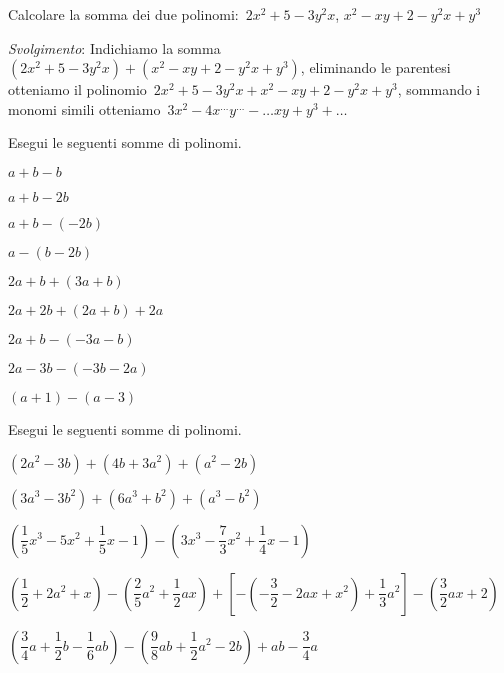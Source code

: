 \begin{esercizio}
\label{ese:10.12}
Calcolare la somma dei due polinomi:~\(2x^2+5-3y^2x\), \(x^2-xy+2-y^2x+y^3\)

\emph{Svolgimento}: Indichiamo la somma~\((2x^2+5-3y^2x)+(x^2-xy+2-y^2x+y^3)\), 
eliminando le parentesi otteniamo
il polinomio~\(2x^2+5-3y^2x+x^2-xy+2-y^2x+y^3\), sommando i monomi simili 
otteniamo~\(3x^2-4x^{\ldots}y^{\ldots}-\ldots xy+y^3+\ldots\)
\end{esercizio}
\begin{esercizio}
\label{ese:10.13}
 Esegui le seguenti somme di polinomi.
\begin{multicols}{3}
 \begin{enumeratea}
 \item \(a+b-b\)
 \item \(a+b-2b\)
 \item \(a+b-(-2b)\)
 \item \(a-(b-2b)\)
 \item \(2a+b+(3a+b)\)
 \item \(2a+2b+(2a+b)+2a\)
 \item \(2a+b-(-3a-b)\)
 \item \(2a-3b-(-3b-2a)\)
 \item \((a+1)-(a-3)\)
\end{enumeratea}
\end{multicols}
\end{esercizio}

\begin{esercizio}[\Ast]
\label{ese:10.14}
 Esegui le seguenti somme di polinomi.

 \begin{enumeratea}
 \item \(\left(2a^{2}-3b\right)+\left(4b+3a^{2}\right)+\left(a^{2}-2b\right)\)
 \item 
\(\left(3a^{3}-3b^{2}\right)+\left(6a^{3}+b^{2}\right)+\left(a^{3}-b^{2}\right)\)
 \item 
\(\left(\dfrac{1}{5}x^{3}-5x^{2}+\dfrac{1}{5}x-1\right)-\left(3x^{3}-\dfrac{7}{3}
x^{2}+\dfrac{1}{4}x-1\right)\)
 \item 
\(\left(\dfrac{1}{2}+2a^{2}+x\right)-\left(\dfrac{2}{5}a^{2}+\dfrac{1}{2}{ax}
\right)+\left[-\left(-{\dfrac{3}{2}}-2{ax}+x^{2}\right)+\dfrac{1}{3}a^{2}\right]
-\left(\dfrac{3}{2}{ax}+2\right)\)
 \item 
\(\left(\dfrac{3}{4}a+\dfrac{1}{2}b-\dfrac{1}{6}{ab}\right)-\left(\dfrac{9}{8}{ab
}+\dfrac{1}{2}a^{2}-2b\right)+{ab}-\dfrac{3}{4}a\)
\end{enumeratea}
\end{esercizio}


